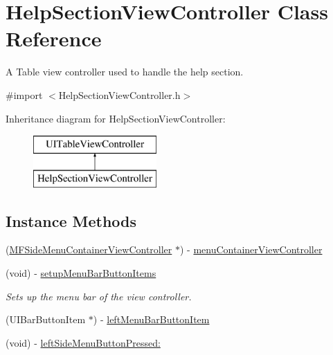 \hypertarget{interface_help_section_view_controller}{\section{Help\-Section\-View\-Controller Class Reference}
\label{interface_help_section_view_controller}
}


A Table view controller used to handle the help section.  




{\ttfamily \#import $<$Help\-Section\-View\-Controller.\-h$>$}

Inheritance diagram for Help\-Section\-View\-Controller\-:\begin{figure}[H]
\begin{center}
\leavevmode
\includegraphics[height=2.000000cm]{interface_help_section_view_controller}
\end{center}
\end{figure}
\subsection*{Instance Methods}
\begin{DoxyCompactItemize}
\item 
(\hyperlink{interface_m_f_side_menu_container_view_controller}{M\-F\-Side\-Menu\-Container\-View\-Controller} $\ast$) -\/ \hyperlink{interface_help_section_view_controller_ad9f497773e1c2f5e420929a60f3bf7df}{menu\-Container\-View\-Controller}
\item 
\hypertarget{interface_help_section_view_controller_a9644bcb73520daa217ad0709b0e6bd64}{(void) -\/ \hyperlink{interface_help_section_view_controller_a9644bcb73520daa217ad0709b0e6bd64}{setup\-Menu\-Bar\-Button\-Items}}\label{interface_help_section_view_controller_a9644bcb73520daa217ad0709b0e6bd64}

\begin{DoxyCompactList}\small\item\em Sets up the menu bar of the view controller. \end{DoxyCompactList}\item 
(U\-I\-Bar\-Button\-Item $\ast$) -\/ \hyperlink{interface_help_section_view_controller_afb11718c8a0c6f7abd85dfbc7adb1cd1}{left\-Menu\-Bar\-Button\-Item}
\item 
(void) -\/ \hyperlink{interface_help_section_view_controller_a738b842dc5261f08da93880f0b006b55}{left\-Side\-Menu\-Button\-Pressed\-:}
\end{DoxyCompactItemize}


